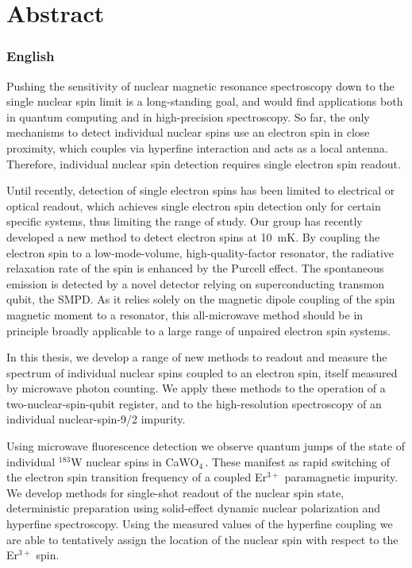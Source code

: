\chapter*{Abstract}

\subsection*{English}

Pushing the sensitivity of nuclear magnetic resonance spectroscopy down to the single nuclear spin limit is a long-standing goal, and would find applications both in quantum computing and in high-precision spectroscopy. So far, the only mechanisms to detect individual nuclear spins use an electron spin in close proximity, which couples via hyperfine interaction and acts as a local antenna. Therefore, individual nuclear spin detection requires single electron spin readout.

Until recently, detection of single electron spins has been limited to electrical or optical readout, which achieves single electron spin detection only for certain specific systems, thus limiting the range of study. Our group has recently developed a new method to detect electron spins at 10~mK. By coupling the electron spin to a low-mode-volume, high-quality-factor resonator, the radiative relaxation rate of the spin is enhanced by the Purcell effect. The spontaneous emission is detected by a novel detector relying on superconducting transmon qubit, the SMPD. As it relies solely on the magnetic dipole coupling of the spin magnetic moment to a resonator, this all-microwave method should be in principle broadly applicable to a large range of unpaired electron spin systems.

In this thesis, we develop a range of new methods to readout and measure the spectrum of individual nuclear spins coupled to an electron spin, itself measured by microwave photon counting. We apply these methods to the operation of a two-nuclear-spin-qubit register, and to the high-resolution spectroscopy of an individual nuclear-spin-9/2 impurity.

Using microwave fluorescence detection we observe quantum jumps of the state of individual $^{183}$W nuclear spins in CaWO$_4$\,. These manifest as rapid switching of the electron spin transition frequency of a coupled Er$^{3+}$ paramagnetic impurity. We develop methods for single-shot readout of the nuclear spin state, deterministic preparation using solid-effect dynamic nuclear polarization and hyperfine spectroscopy. Using the measured values of the hyperfine coupling we are able to tentatively assign the location of the nuclear spin with respect to the Er$^{3+}$ spin.

